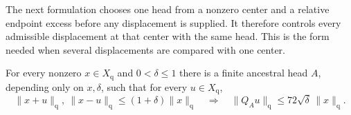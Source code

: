 The next formulation chooses one head from a nonzero center and a relative
endpoint excess before any displacement is supplied. It therefore controls
every admissible displacement at that center with the same head. This is
the form needed when several displacements are compared with one center.

\begin{proposition}\label{qp:relative-seventytwo}
For every nonzero $x\in X_{\mathrm q}$ and $0<\delta\le1$ there
is a finite ancestral head $A$, depending only on $x,\delta$, such
that for every $u\in X_{\mathrm q}$,
\[
 \|x+u\|_{\mathrm q},\ \|x-u\|_{\mathrm q}
       \le(1+\delta)\|x\|_{\mathrm q}
 \quad\Longrightarrow\quad
 \|Q_Au\|_{\mathrm q}\le72\sqrt\delta\,\|x\|_{\mathrm q}.
\]
\end{proposition}

